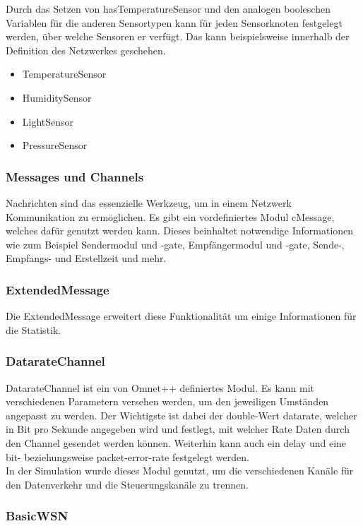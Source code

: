 Durch das Setzen von hasTemperatureSensor und den analogen booleschen Variablen für die anderen Sensortypen kann für jeden Sensorknoten festgelegt werden, über welche Sensoren er verfügt. Das kann beispielsweise innerhalb der Definition des Netzwerkes geschehen.

\begin{itemize}
\item TemperatureSensor
\item HumiditySensor
\item LightSensor
\item PressureSensor
\end{itemize}

\subsubsection{Messages und Channels}

Nachrichten sind das essenzielle Werkzeug, um in einem Netzwerk Kommunikation zu ermöglichen. Es gibt ein vordefiniertes Modul cMessage, welches dafür genutzt werden kann. Dieses beinhaltet notwendige Informationen wie zum Beispiel Sendermodul und -gate, Empfängermodul und -gate, Sende-, Empfangs- und Erstellzeit und mehr.

\subsubsection{ExtendedMessage}

Die ExtendedMessage erweitert diese Funktionalität um einige Informationen für die Statistik.

\subsubsection{DatarateChannel}

DatarateChannel ist ein von Omnet++ definiertes Modul. Es kann mit verschiedenen Parametern versehen werden, um den jeweiligen Umständen angepasst zu werden. Der Wichtigste ist dabei der double-Wert datarate, welcher in Bit pro Sekunde angegeben wird und festlegt, mit welcher Rate Daten durch den Channel gesendet werden können. Weiterhin kann auch ein delay und eine bit- beziehungsweise packet-error-rate festgelegt werden.\\
In der Simulation wurde dieses Modul genutzt, um die verschiedenen Kanäle für den Datenverkehr und die Steuerungskanäle zu trennen.

\subsubsection{BasicWSN}

